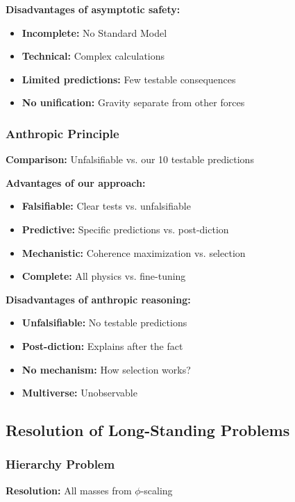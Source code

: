 \documentclass[11pt]{article}
\theoremstyle{definition}
\newcommand{\goldenratio}{\phi}
\begin{document}
\textbf{Disadvantages of asymptotic safety:}
\begin{itemize}
\item \textbf{Incomplete:} No Standard Model
\item \textbf{Technical:} Complex calculations
\item \textbf{Limited predictions:} Few testable consequences
\item \textbf{No unification:} Gravity separate from other forces
\end{itemize}

\subsubsection{Anthropic Principle}

\textbf{Comparison:} Unfalsifiable vs. our 10 testable predictions

\textbf{Advantages of our approach:}
\begin{itemize}
\item \textbf{Falsifiable:} Clear tests vs. unfalsifiable
\item \textbf{Predictive:} Specific predictions vs. post-diction
\item \textbf{Mechanistic:} Coherence maximization vs. selection
\item \textbf{Complete:} All physics vs. fine-tuning
\end{itemize}

\textbf{Disadvantages of anthropic reasoning:}
\begin{itemize}
\item \textbf{Unfalsifiable:} No testable predictions
\item \textbf{Post-diction:} Explains after the fact
\item \textbf{No mechanism:} How selection works?
\item \textbf{Multiverse:} Unobservable
\end{itemize}

\subsection{Resolution of Long-Standing Problems}

\subsubsection{Hierarchy Problem}

\textbf{Resolution:} All masses from $\goldenratio$-scaling
\end{document}
